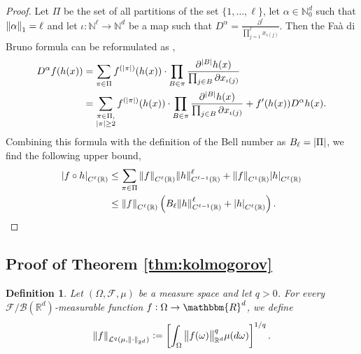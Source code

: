 \documentclass{article}
\numberwithin{equation}{section}
\newcommand{\R}{\mathbb{R}}
\newcommand{\N}{\mathbb{N}}
\newcommand{\1}{\mathbbm{1}}
\newtheorem{definition}[theorem]{Definition}
\begin{document}
\begin{proof}
Let $\Pi$ be the set of all partitions of the set $\{1, \ldots, \ell\}$, let $\alpha\in \N_0^d$ such that $\norm{\alpha}_1=\ell$ and let $\iota:\N^\ell\to\N^d$ be a map such that $D^\alpha = \frac{\partial^\ell}{\prod_{j=1}^\ell x_{\iota(j)}}$. Then the Faà di Bruno formula can be reformulated as \cite{constantine1996multivariate}, 
\begin{equation}
\begin{split}
    D^\alpha f(h(x)) &= \sum_{\pi\in\Pi}f^{(\abs{\pi})}(h(x))\cdot \prod_{B\in\pi} \frac{\partial^{\abs{B}}h(x)}{\prod_{j\in B} \partial x_{\iota(j)}}\\
    &= \sum_{\substack{\pi\in\Pi,\\\abs{\pi}\geq 2}}f^{(\abs{\pi})}(h(x))\cdot \prod_{B\in\pi} \frac{\partial^{\abs{B}}h(x)}{\prod_{j\in B} \partial x_{\iota(j)}} + f'(h(x)) D^\alpha h(x). 
\end{split}
\end{equation}
Combining this formula with the definition of the Bell number as $B_\ell = \abs{\Pi}$, we find the following upper bound, 
\begin{equation}
\begin{split}
    \abs{ f\circ h}_{C^\ell(\R)} &\leq \sum_{\pi\in\Pi}\norm{f}_{C^\ell(\R)}\norm{h}_{C^{\ell-1}(\R)}^\ell +  \norm{f}_{C^1(\R)} \abs{ h}_{C^\ell(\R)}\\
    &\leq \norm{f}_{C^\ell(\R)}\left(B_\ell\norm{h}_{C^{\ell-1}(\R)}^\ell+ \abs{ h}_{C^\ell(\R)}\right).
\end{split}
\end{equation}
\end{proof}

\subsection{Proof of Theorem \ref{thm:kolmogorov}}\label{app:kolmogorov}

\begin{definition}\label{def:lq}
Let $(\Omega, \mathcal{F}, \mu)$ be a measure space and let $q>0$. For every $\mathcal{F}/\mathcal{B}(\mathbb{R}^d)$-measurable function $f:\Omega\to\mathbbm{R}^d$, we define
\begin{equation}
    \norm{f}_{\mathcal{L}^q(\mu, \norm{\cdot}_{\mathbb{R}^d})} := \left[\int_\Omega\norm{f(\omega)}_{\mathbb{R}^d}^q \mu(d\omega)\right]^{1/q}.
\end{equation}
\end{definition}
\end{document}
